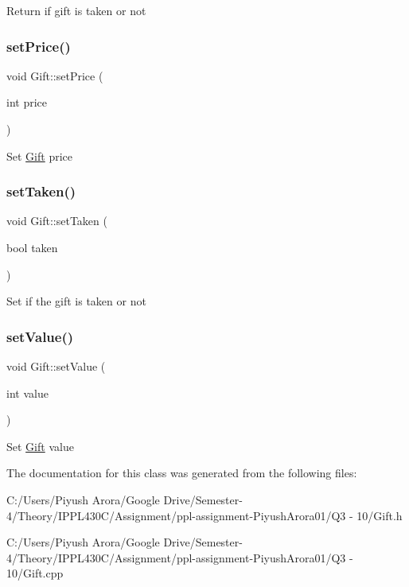 Return if gift is taken or not \mbox{\label{class_gift_a3e497fb858aade883c0b18c979963d83}} 
\subsubsection{\texorpdfstring{set\+Price()}{setPrice()}}
{\footnotesize\ttfamily void Gift\+::set\+Price (\begin{DoxyParamCaption}\item[{int}]{price }\end{DoxyParamCaption})}

Set \hyperlink{class_gift}{Gift} price \mbox{\label{class_gift_a9c7541319435d48c46ea47ec16d7a0f6}} 
\subsubsection{\texorpdfstring{set\+Taken()}{setTaken()}}
{\footnotesize\ttfamily void Gift\+::set\+Taken (\begin{DoxyParamCaption}\item[{bool}]{taken }\end{DoxyParamCaption})}

Set if the gift is taken or not \mbox{\label{class_gift_a40368c3ac78745ce67d3a2496ba3e9ce}} 
\subsubsection{\texorpdfstring{set\+Value()}{setValue()}}
{\footnotesize\ttfamily void Gift\+::set\+Value (\begin{DoxyParamCaption}\item[{int}]{value }\end{DoxyParamCaption})}

Set \hyperlink{class_gift}{Gift} value 

The documentation for this class was generated from the following files\+:\begin{DoxyCompactItemize}
\item 
C\+:/\+Users/\+Piyush Arora/\+Google Drive/\+Semester-\/4/\+Theory/\+I\+P\+P\+L430\+C/\+Assignment/ppl-\/assignment-\/\+Piyush\+Arora01/\+Q3 -\/ 10/Gift.\+h\item 
C\+:/\+Users/\+Piyush Arora/\+Google Drive/\+Semester-\/4/\+Theory/\+I\+P\+P\+L430\+C/\+Assignment/ppl-\/assignment-\/\+Piyush\+Arora01/\+Q3 -\/ 10/Gift.\+cpp\end{DoxyCompactItemize}
